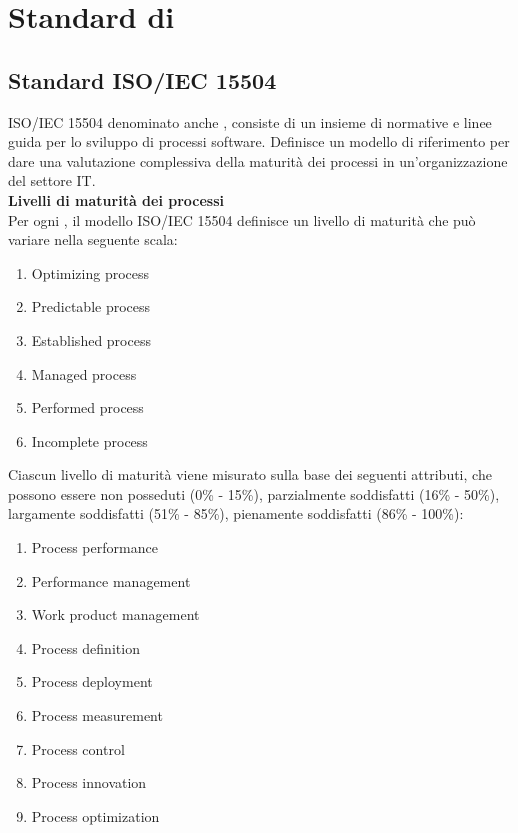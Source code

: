 \section{Standard di } 
\subsection{Standard ISO/IEC 15504}\label{AppQualitaProcessi}
ISO/IEC 15504 denominato anche \textbf{}, consiste di un insieme di normative e linee guida per lo sviluppo di processi software.
Definisce un modello di riferimento per dare una valutazione complessiva della maturità dei processi in un'organizzazione del settore IT.\\
\textbf{Livelli di maturità dei processi}\\
Per ogni , il modello ISO/IEC 15504 definisce un livello di maturità che può variare nella seguente scala:
\begin{enumerate}
\item Optimizing process
\item Predictable process
\item Established process
\item Managed process
\item Performed process
\item Incomplete process
\end{enumerate}
Ciascun livello di maturità viene misurato sulla base dei seguenti attributi, che possono essere non posseduti (0\% - 15\%), parzialmente soddisfatti (16\% - 50\%), largamente soddisfatti (51\% - 85\%), pienamente soddisfatti (86\% - 100\%):
\begin{enumerate}
\item Process performance
\item Performance management
\item Work product management
\item Process definition
\item Process deployment
\item Process measurement
\item Process control
\item Process innovation
\item Process optimization
\end{enumerate}
